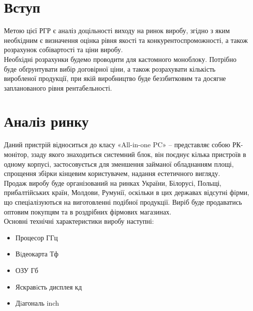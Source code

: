\documentclass[a4paper,14pt]{extreport}
\begin{document}
\tableofcontents
\setcounter{page}{2}
\newpage

\chapter{Вступ}
    Метою цієї РГР є аналіз доцільності виходу на ринок виробу, згідно з яким
    необхідним є визначення оцінка рівня якості та конкурентоспроможності, а також
    розрахунок собівартості та ціни виробу.\\ 

    Необхідні розрахунки будемо проводити для кастомного моноблоку. 
    Потрібно буде обґрунтувати вибір договірної ціни, а також розрахувати кількість
    виробленої продукції, при якій виробництво буде беззбитковим та досягне
    запланованого рівня рентабельності.


\chapter{Аналіз ринку}
    Даний   пристрій відноситься до класу «All-in-one PC» -- представляє собою РК-монітор, ззаду якого знаходиться системний блок, він поєднує кілька пристроїв в одному корпусі, застосовується для зменшення займаної обладнанням площі, спрощення збірки кінцевим користувачем, надання естетичного вигляду.\\

    Продаж виробу буде організований на ринках України, Білорусі, Польщі, прибалтійських
    країн, Молдови, Румунії, оскільки в цих державах відсутні фірми, що спеціалізуються на
    виготовленні подібної продукції.  Виріб буде продаватись оптовим покупцям та в роздрібних фірмових магазинах.\\ 

    Основні технічні характеристики виробу наступні:
    \begin{itemize}
    \item Процесор  ГГц 
    \item Вiдеокарта  Тф
    \item ОЗУ  Гб
    \item Яскравiсть дисплея  кд
    \item Дiагональ  inch
    \end{itemize}
\end{document}
